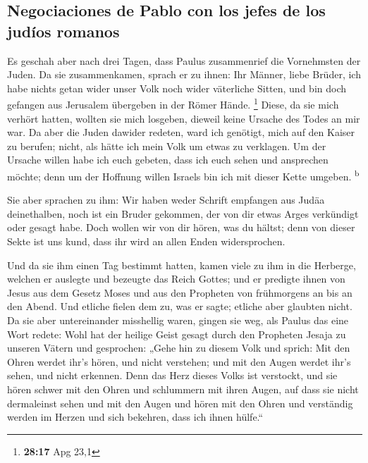 \hypertarget{negociaciones-de-pablo-con-los-jefes-de-los-juduxedos-romanos}{%
\subsection{Negociaciones de Pablo con los jefes de los judíos
romanos}\label{negociaciones-de-pablo-con-los-jefes-de-los-juduxedos-romanos}}

 Es geschah aber nach drei Tagen, dass Paulus
zusammenrief die Vornehmsten der Juden. Da sie zusammenkamen, sprach er
zu ihnen: Ihr Männer, liebe Brüder, ich habe nichts getan wider unser
Volk noch wider väterliche Sitten, und bin doch gefangen aus Jerusalem
übergeben in der Römer Hände. \footnote{\textbf{28:17} Apg 23,1}
 Diese, da sie mich verhört hatten, wollten sie mich
losgeben, dieweil keine Ursache des Todes an mir war.  Da
aber die Juden dawider redeten, ward ich genötigt, mich auf den Kaiser
zu berufen; nicht, als hätte ich mein Volk um etwas zu verklagen.
 Um der Ursache willen habe ich euch gebeten, dass ich
euch sehen und ansprechen möchte; denn um der Hoffnung willen Israels
bin ich mit dieser Kette umgeben. \textsuperscript{b}

 Sie aber sprachen zu ihm: Wir haben weder Schrift
empfangen aus Judäa deinethalben, noch ist ein Bruder gekommen, der von
dir etwas Arges verkündigt oder gesagt habe.  Doch wollen
wir von dir hören, was du hältst; denn von dieser Sekte ist uns kund,
dass ihr wird an allen Enden widersprochen.

 Und da sie ihm einen Tag bestimmt hatten, kamen viele zu
ihm in die Herberge, welchen er auslegte und bezeugte das Reich Gottes;
und er predigte ihnen von Jesus aus dem Gesetz Moses und aus den
Propheten von frühmorgens an bis an den Abend.  Und
etliche fielen dem zu, was er sagte; etliche aber glaubten nicht.
 Da sie aber untereinander misshellig waren, gingen sie
weg, als Paulus das eine Wort redete: Wohl hat der heilige Geist gesagt
durch den Propheten Jesaja zu unseren Vätern  und
gesprochen: „Gehe hin zu diesem Volk und sprich: Mit den Ohren werdet
ihr's hören, und nicht verstehen; und mit den Augen werdet ihr's sehen,
und nicht erkennen.  Denn das Herz dieses Volks ist
verstockt, und sie hören schwer mit den Ohren und schlummern mit ihren
Augen, auf dass sie nicht dermaleinst sehen und mit den Augen und hören
mit den Ohren und verständig werden im Herzen und sich bekehren, dass
ich ihnen hülfe.``

